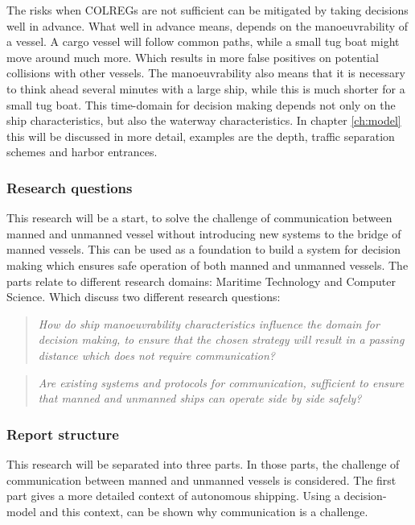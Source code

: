 The risks when \ac{COLREGs} are not sufficient can be mitigated by taking decisions well in advance. What well in advance means, depends on the manoeuvrability of a vessel. A cargo vessel will follow common paths, while a small tug boat might move around much more. Which results in more false positives on potential collisions with other vessels. The manoeuvrability also means that it is necessary to think ahead several minutes with a large ship, while this is much shorter for a small tug boat. This time-domain for decision making depends not only on the ship characteristics, but also the waterway characteristics. In chapter \ref{ch:model} this will be discussed in more detail, examples are the depth, traffic separation schemes and harbor entrances.

\subsubsection*{Research questions}
This research will be a start, to solve the challenge of communication between manned and unmanned vessel without introducing new systems to the bridge of manned vessels. This can be used as a foundation to build a system for decision making which ensures safe operation of both manned and unmanned vessels. The parts relate to different research domains: Maritime Technology and Computer Science. Which discuss two different research questions:

\begin{quotation}
	\emph{How do ship manoeuvrability characteristics influence the domain for decision making, to ensure that the chosen strategy will result in a passing distance which does not require communication?} 
\end{quotation}

\begin{quotation}
	\emph{Are existing systems and protocols for communication, sufficient to ensure that manned and unmanned ships can operate side by side safely?}
\end{quotation}

\subsubsection*{Report structure}
This research will be separated into three parts. In those parts, the challenge of communication between manned and unmanned vessels is considered. The first part gives a more detailed context of autonomous shipping. Using a decision-model and this context, can be shown why communication is a challenge.

